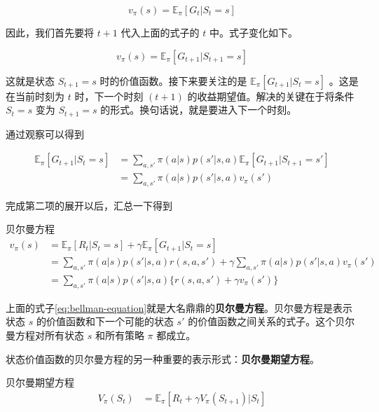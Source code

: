 \documentclass[lang=cn,newtx,10pt,scheme=chinese]{elegantbook}
\begin{document}
\begin{equation}
v_\pi(s) = \mathbb{E}_\pi[G_t|S_t=s]
\end{equation}

因此，我们首先要将 $t+1$ 代入上面的式子的 $t$ 中。式子变化如下。

\begin{equation}
v_\pi(s) = \mathbb{E}_\pi[G_{t+1}|S_{t+1}=s]
\end{equation}

这就是状态 $S_{t+1}=s$ 时的价值函数。接下来要关注的是 $\mathbb{E}_\pi[G_{t+1}|S_t=s]$ 。这是在当前时刻为 $t$ 时，下一个时刻 $(t+1)$ 的收益期望值。解决的关键在于将条件 $S_t=s$ 变为 $S_{t+1}=s$ 的形式。换句话说，就是要进入下一个时刻。

通过观察可以得到

\begin{equation}
\begin{aligned}
\mathbb{E}_\pi[G_{t+1}|S_t=s] &= \sum_{a,s'}\pi(a|s)p(s'|s,a)\mathbb{E}_\pi[G_{t+1}|S_{t+1}=s'] \\
&= \sum_{a,s'}\pi(a|s)p(s'|s,a)v_\pi(s')
\end{aligned}
\end{equation}

完成第二项的展开以后，汇总一下得到

\begin{theorem}{贝尔曼方程}{}
\begin{equation}\label{eq:bellman-equation}
\begin{aligned}
v_\pi(s) &= \mathbb{E}_\pi[R_t|S_t=s] + \gamma\mathbb{E}_\pi[G_{t+1}|S_t=s] \\
&= \sum_{a,s'}\pi(a|s)p(s'|s,a)r(s,a,s')+\gamma\sum_{a,s'}\pi(a|s)p(s'|s,a)v_\pi(s') \\
&= \sum_{a,s'}\pi(a|s)p(s'|s,a)\{r(s,a,s')+\gamma v_\pi(s')\}
\end{aligned}
\end{equation}
\end{theorem}

上面的式子\ref{eq:bellman-equation}就是大名鼎鼎的\textbf{贝尔曼方程}。贝尔曼方程是表示状态 $s$ 的价值函数和下一个可能的状态 $s'$ 的价值函数之间关系的式子。这个贝尔曼方程对所有状态 $s$ 和所有策略 $\pi$ 都成立。

状态价值函数的贝尔曼方程的另一种重要的表示形式：\textbf{贝尔曼期望方程}。

\begin{theorem}{贝尔曼期望方程}{}
\begin{equation}\label{eq:bellman-expectation-equation-0}
\begin{aligned}
V_\pi(S_t)
&= \mathbb{E}_\pi[R_t+\gamma V_\pi(S_{t+1})|S_t] \\
\end{aligned}
\end{equation}
\end{theorem}
\end{document}
